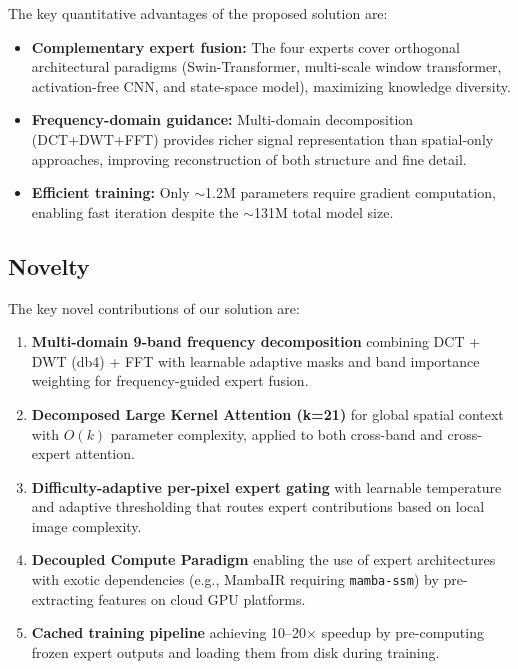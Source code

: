 \documentclass[10pt,twocolumn,letterpaper]{article}
\begin{document}
The key quantitative advantages of the proposed solution are:
\begin{itemize}[nosep]
\item \textbf{Complementary expert fusion:} The four experts cover orthogonal architectural paradigms (Swin-Transformer, multi-scale window transformer, activation-free CNN, and state-space model), maximizing knowledge diversity.
\item \textbf{Frequency-domain guidance:} Multi-domain decomposition (DCT+DWT+FFT) provides richer signal representation than spatial-only approaches, improving reconstruction of both structure and fine detail.
\item \textbf{Efficient training:} Only $\sim$1.2M parameters require gradient computation, enabling fast iteration despite the $\sim$131M total model size.
\end{itemize}

\subsection{Novelty}

The key novel contributions of our solution are:

\begin{enumerate}[nosep]
\item \textbf{Multi-domain 9-band frequency decomposition} combining DCT + DWT (db4) + FFT with learnable adaptive masks and band importance weighting for frequency-guided expert fusion.

\item \textbf{Decomposed Large Kernel Attention (k=21)} for global spatial context with $O(k)$ parameter complexity, applied to both cross-band and cross-expert attention.

\item \textbf{Difficulty-adaptive per-pixel expert gating} with learnable temperature and adaptive thresholding that routes expert contributions based on local image complexity.

\item \textbf{Decoupled Compute Paradigm} enabling the use of expert architectures with exotic dependencies (e.g., MambaIR requiring \texttt{mamba-ssm}) by pre-extracting features on cloud GPU platforms.

\item \textbf{Cached training pipeline} achieving 10--20$\times$ speedup by pre-computing frozen expert outputs and loading them from disk during training.
\end{enumerate}
\end{document}
